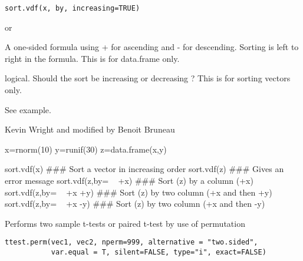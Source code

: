 \documentclass[a4paper]{book}
\begin{document}
%
\begin{Usage}
\begin{verbatim}
sort.vdf(x, by, increasing=TRUE)
\end{verbatim}
\end{Usage}
%
\begin{Arguments}
\begin{ldescription}
\item[\code{x}]  or 
\item[\code{by}] A one-sided formula using + for ascending and - for descending. Sorting is left to right in the formula. This is for data.frame only.
\item[\code{increasing}] logical. Should the sort be increasing  or decreasing ? This is for sorting vectors only.

\end{ldescription}
\end{Arguments}
%
\begin{Details}\relax
See example.
\end{Details}
%
\begin{Author}\relax
Kevin Wright and modified by Benoit Bruneau
\end{Author}
%
\begin{Examples}
\begin{ExampleCode}
x=rnorm(10)
y=runif(30)
z=data.frame(x,y)

sort.vdf(x)                 ### Sort a vector in increasing order
sort.vdf(z)                 ### Gives an error message
sort.vdf(z,by= ~ +x)        ### Sort (z) by a column (+x)
sort.vdf(z,by= ~ +x +y)     ### Sort (z) by two column (+x and then +y)
sort.vdf(z,by= ~ +x -y)     ### Sort (z) by two column (+x and then -y)
\end{ExampleCode}
\end{Examples}
\newpage
{}
%
\begin{Description}\relax
Performs two sample t-tests  or paired t-test by use of permutation
\end{Description}
%
\begin{Usage}
\begin{verbatim}
ttest.perm(vec1, vec2, nperm=999, alternative = "two.sided",
           var.equal = T, silent=FALSE, type="i", exact=FALSE)
\end{verbatim}
\end{Usage}
%
\end{document}
